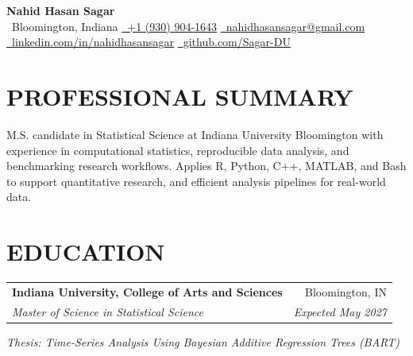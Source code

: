 \documentclass[10pt,letterpaper]{article}
\makeatletter
\newcommand{\resumeEntry}[4]{%
  \begin{tabularx}{\textwidth}{@{}Xr@{}}
    \textbf{#1} & #2 \\
    \textit{#3} & \textit{#4}
  \end{tabularx}%
}
\newcommand{\contactsep}{\qquad}
\makeatother
\begin{document}
\normalsize

\begin{center}
  {\LARGE
   \textbf{Nahid Hasan Sagar}}\\[2.2pt]

  {\footnotesize
    \faMapMarker*\, Bloomington, Indiana
    \contactsep
    \href{tel:+19309041643}{\faPhone*\, +1 (930) 904-1643}
    \contactsep
    \href{mailto:nahidhasansagar@gmail.com}{\faEnvelope\, nahidhasansagar@gmail.com}
  }\\[-0.2pt]

  {\footnotesize
    \href{https://www.linkedin.com/in/nahidhasansagar/}{\faLinkedinIn\, linkedin.com/in/nahidhasansagar}
    \contactsep
    \href{https://github.com/Sagar-DU}{\faGithub\, github.com/Sagar-DU}
  }
\end{center}

\vspace{-5pt}

\section*{PROFESSIONAL SUMMARY}

M.S. candidate in Statistical Science at Indiana University Bloomington with experience in computational statistics, reproducible data analysis, and benchmarking research workflows. Applies R, Python, C++, MATLAB, and Bash to support quantitative research, and efficient analysis pipelines for real-world data.

\section*{EDUCATION}

\resumeEntry
  {Indiana University, College of Arts and Sciences}
  {Bloomington, IN}
  {Master of Science in Statistical Science}
  {Expected May 2027}

\vspace{0.4pt}

\textit{Thesis: Time-Series Analysis Using Bayesian Additive Regression Trees (BART)}

\vspace{0.5pt}
\end{document}
